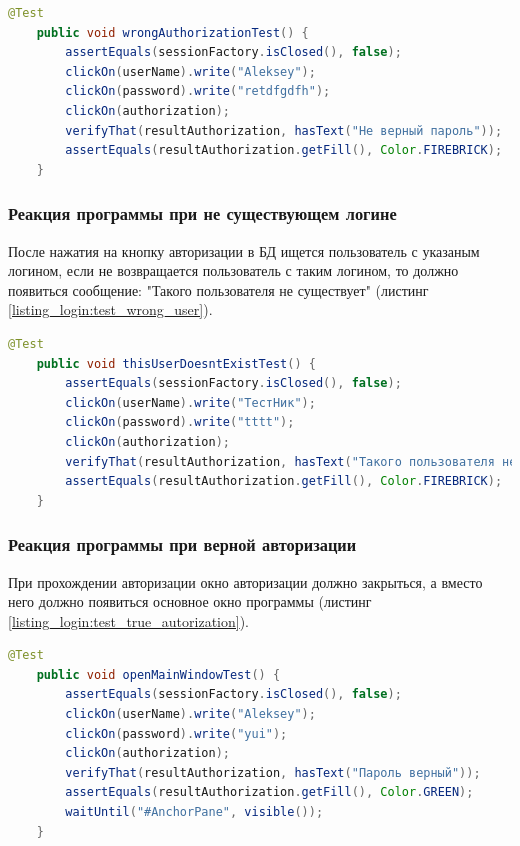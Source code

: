 \documentclass[a4paper,12pt]{article}
\begin{document}
\begin{lstlisting}[language=java, caption=Тестирование ввода неверного пароля, label=listing_login:test_wrong_password]      
    @Test
    public void wrongAuthorizationTest() {
        assertEquals(sessionFactory.isClosed(), false);
        clickOn(userName).write("Aleksey");
        clickOn(password).write("retdfgdfh");
        clickOn(authorization);
        verifyThat(resultAuthorization, hasText("Не верный пароль"));
        assertEquals(resultAuthorization.getFill(), Color.FIREBRICK);
    }
\end{lstlisting}

\subsubsection{Реакция программы при не существующем логине}
После нажатия на кнопку авторизации в БД ищется пользователь с указаным логином, если не возвращается пользователь с таким логином, то должно появиться сообщение: "Такого пользователя не существует" (листинг \ref{listing_login:test_wrong_user}).
\begin{lstlisting}[language=java, caption=Тестирование при несуществующем логине, label=listing_login:test_wrong_user]
    @Test
    public void thisUserDoesntExistTest() {
        assertEquals(sessionFactory.isClosed(), false);
        clickOn(userName).write("ТестНик");
        clickOn(password).write("tttt");
        clickOn(authorization);
        verifyThat(resultAuthorization, hasText("Такого пользователя не существует"));
        assertEquals(resultAuthorization.getFill(), Color.FIREBRICK);
    }
\end{lstlisting}


\subsubsection{Реакция программы при верной авторизации}
При прохождении авторизации окно авторизации должно закрыться, а вместо него должно появиться основное окно программы (листинг \ref{listing_login:test_true_autorization}). 

\begin{lstlisting}[language=java, caption=Тестирование прохождения авторизации, label=listing_login:test_true_autorization]
    @Test
    public void openMainWindowTest() {
        assertEquals(sessionFactory.isClosed(), false);
        clickOn(userName).write("Aleksey");
        clickOn(password).write("yui");
        clickOn(authorization);
        verifyThat(resultAuthorization, hasText("Пароль верный"));
        assertEquals(resultAuthorization.getFill(), Color.GREEN);
        waitUntil("#AnchorPane", visible());
    }
\end{lstlisting}
\end{document}
